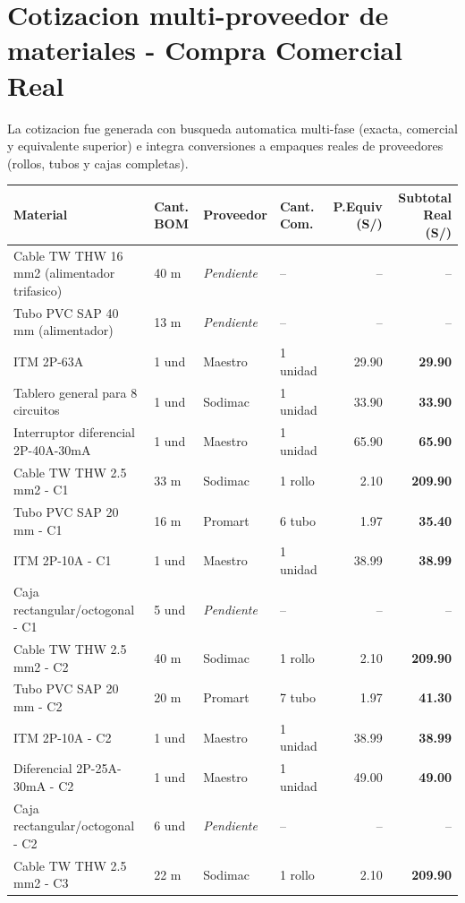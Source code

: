 \section{Cotizacion multi-proveedor de materiales - Compra Comercial Real}

La cotizacion fue generada con busqueda automatica multi-fase (exacta, comercial y equivalente superior) e integra conversiones a empaques reales de proveedores (rollos, tubos y cajas completas).

\begin{longtable}{p{5.0cm} p{1.5cm} p{2.2cm} p{2.2cm} r r}
\toprule
\textbf{Material} & \textbf{Cant. BOM} & \textbf{Proveedor} & \textbf{Cant. Com.} & \textbf{P.Equiv (S/)} & \textbf{Subtotal Real (S/)} \\
\midrule
Cable TW THW 16 mm2 (alimentador trifasico) & 40 m & \textit{Pendiente} & -- & -- & -- \\
Tubo PVC SAP 40 mm (alimentador) & 13 m & \textit{Pendiente} & -- & -- & -- \\
ITM 2P-63A & 1 und & Maestro & 1 unidad & 29.90 & \textbf{29.90} \\
Tablero general para 8 circuitos & 1 und & Sodimac & 1 unidad & 33.90 & \textbf{33.90} \\
Interruptor diferencial 2P-40A-30mA & 1 und & Maestro & 1 unidad & 65.90 & \textbf{65.90} \\
Cable TW THW 2.5 mm2 - C1 & 33 m & Sodimac & 1 rollo & 2.10 & \textbf{209.90} \\
Tubo PVC SAP 20 mm - C1 & 16 m & Promart & 6 tubo & 1.97 & \textbf{35.40} \\
ITM 2P-10A - C1 & 1 und & Maestro & 1 unidad & 38.99 & \textbf{38.99} \\
Caja rectangular/octogonal - C1 & 5 und & \textit{Pendiente} & -- & -- & -- \\
Cable TW THW 2.5 mm2 - C2 & 40 m & Sodimac & 1 rollo & 2.10 & \textbf{209.90} \\
Tubo PVC SAP 20 mm - C2 & 20 m & Promart & 7 tubo & 1.97 & \textbf{41.30} \\
ITM 2P-10A - C2 & 1 und & Maestro & 1 unidad & 38.99 & \textbf{38.99} \\
Diferencial 2P-25A-30mA - C2 & 1 und & Maestro & 1 unidad & 49.00 & \textbf{49.00} \\
Caja rectangular/octogonal - C2 & 6 und & \textit{Pendiente} & -- & -- & -- \\
Cable TW THW 2.5 mm2 - C3 & 22 m & Sodimac & 1 rollo & 2.10 & \textbf{209.90} \\

\end{longtable}
